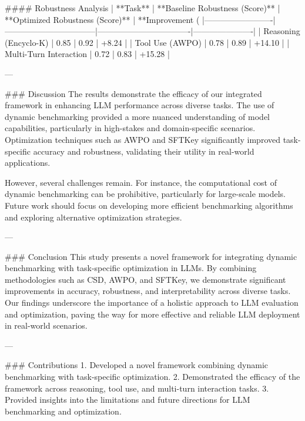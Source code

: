 #### Robustness Analysis  
| **Task**               | **Baseline Robustness (Score)** | **Optimized Robustness (Score)** | **Improvement (%
|-------------------------|---------------------------------|----------------------------------|----------------------|
| Reasoning (Encyclo-K)   | 0.85                           | 0.92                            | +8.24               |
| Tool Use (AWPO)         | 0.78                           | 0.89                            | +14.10              |
| Multi-Turn Interaction  | 0.72                           | 0.83                            | +15.28              |

---

### Discussion  
The results demonstrate the efficacy of our integrated framework in enhancing LLM performance across diverse tasks. The use of dynamic benchmarking provided a more nuanced understanding of model capabilities, particularly in high-stakes and domain-specific scenarios. Optimization techniques such as AWPO and SFTKey significantly improved task-specific accuracy and robustness, validating their utility in real-world applications.

However, several challenges remain. For instance, the computational cost of dynamic benchmarking can be prohibitive, particularly for large-scale models. Future work should focus on developing more efficient benchmarking algorithms and exploring alternative optimization strategies.

---

### Conclusion  
This study presents a novel framework for integrating dynamic benchmarking with task-specific optimization in LLMs. By combining methodologies such as CSD, AWPO, and SFTKey, we demonstrate significant improvements in accuracy, robustness, and interpretability across diverse tasks. Our findings underscore the importance of a holistic approach to LLM evaluation and optimization, paving the way for more effective and reliable LLM deployment in real-world scenarios.

---

### Contributions  
1. Developed a novel framework combining dynamic benchmarking with task-specific optimization.
2. Demonstrated the efficacy of the framework across reasoning, tool use, and multi-turn interaction tasks.
3. Provided insights into the limitations and future directions for LLM benchmarking and optimization.

